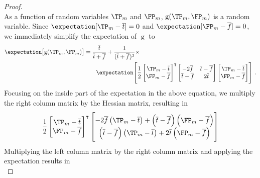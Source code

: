 \documentclass[ ../main.tex]{subfiles}
\begin{document}
\begin{proof}
\begin{equation}
\end{equation}
As a function of random variables $\TP_m$ and $\FP_m$, $\operatorname{g}\!\left(\TP_m,\FP_m\right)$ is a random variable. Since $\expectation[\TP_m - \overline{t}] = 0$ and $\expectation[\FP_m - \overline{f}] = 0$, we immediately simplify the expectation of $\operatorname{g}$ to
\begin{equation}
\label{eq:proof_hess1}
\begin{split}
    \expectation\!\left[\operatorname{g}(\TP_m,\FP_m)\right]
    &= \frac{\overline{t}}{\overline{t}+\overline{f}} + \frac{1}{(\overline{t} + \overline{f})^3} \times\\
    & \qquad \expectation\!\left[\frac{1}{2}
    \begin{bmatrix}
        \TP_m - \overline{t}\\
        \FP_m - \overline{f}
    \end{bmatrix}^{\intercal}
    \begin{bmatrix}
        -2 \overline{f} & \overline{t}-\overline{f}\\
        \overline{t}-\overline{f} & 2 \overline{t}
    \end{bmatrix}
    \begin{bmatrix}
        \TP_m - \overline{t}\\
        \FP_m - \overline{f}
    \end{bmatrix}
    \right]\,.
\end{split}
\end{equation}
Focusing on the inside part of the expectation in the above equation, we multiply the right column matrix by the Hessian matrix, resulting in
\begin{equation}
    \frac{1}{2}
    \begin{bmatrix}
        \TP_m - \overline{t}\\
        \FP_m - \overline{f}
    \end{bmatrix}^{\intercal}
    \begin{bmatrix}
        -2 \overline{f} \left(\TP_m - \overline{t}\right) + \left(\overline{t}-\overline{f}\right)\left(\FP_m - \overline{f}\right)\\
        \left(\overline{t}-\overline{f}\right)\left(\TP_m - \overline{t}\right) + 2 \overline{t}\left(\FP_m - \overline{f}\right)
    \end{bmatrix}
\end{equation}
Multiplying the left column matrix by the right column matrix and applying the expectation results in
\begin{equation}

\end{equation}
\end{proof}
\end{document}

